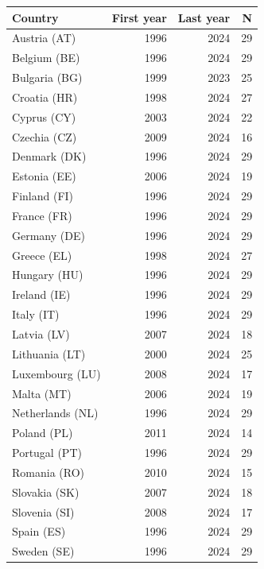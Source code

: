 \begin{tabularx}{\linewidth}{@{}Y r r r@{}}
\toprule
\textbf{Country} & \textbf{First year} & \textbf{Last year} & \textbf{N}\\
\midrule
Austria (AT) & 1996 & 2024 & 29\\
Belgium (BE) & 1996 & 2024 & 29\\
Bulgaria (BG) & 1999 & 2023 & 25\\
Croatia (HR) & 1998 & 2024 & 27\\
Cyprus (CY) & 2003 & 2024 & 22\\
Czechia (CZ) & 2009 & 2024 & 16\\
Denmark (DK) & 1996 & 2024 & 29\\
Estonia (EE) & 2006 & 2024 & 19\\
Finland (FI) & 1996 & 2024 & 29\\
France (FR) & 1996 & 2024 & 29\\
Germany (DE) & 1996 & 2024 & 29\\
Greece (EL) & 1998 & 2024 & 27\\
Hungary (HU) & 1996 & 2024 & 29\\
Ireland (IE) & 1996 & 2024 & 29\\
Italy (IT) & 1996 & 2024 & 29\\
Latvia (LV) & 2007 & 2024 & 18\\
Lithuania (LT) & 2000 & 2024 & 25\\
Luxembourg (LU) & 2008 & 2024 & 17\\
Malta (MT) & 2006 & 2024 & 19\\
Netherlands (NL) & 1996 & 2024 & 29\\
Poland (PL) & 2011 & 2024 & 14\\
Portugal (PT) & 1996 & 2024 & 29\\
Romania (RO) & 2010 & 2024 & 15\\
Slovakia (SK) & 2007 & 2024 & 18\\
Slovenia (SI) & 2008 & 2024 & 17\\
Spain (ES) & 1996 & 2024 & 29\\
Sweden (SE) & 1996 & 2024 & 29\\
\bottomrule
\end{tabularx}
